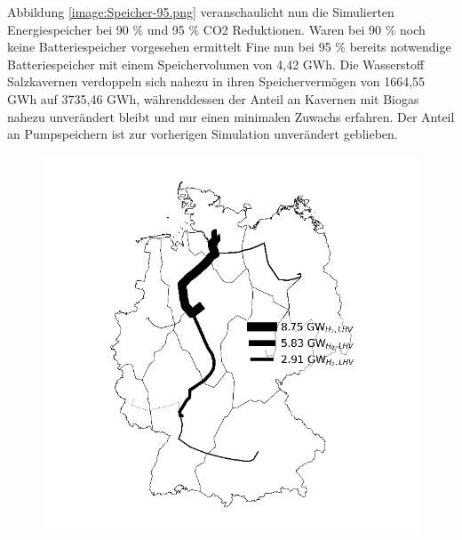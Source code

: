Abbildung \ref{image:Speicher-95.png} veranschaulicht nun die Simulierten Energiespeicher bei 90 \% und 95 \% CO2 Reduktionen. Waren bei 90 \% noch keine Batteriespeicher vorgesehen ermittelt Fine nun bei 95 \% bereits notwendige Batteriespeicher mit einem Speichervolumen von 4,42 GWh. Die Wasserstoff Salzkavernen verdoppeln sich nahezu in ihren Speichervermögen von 1664,55 GWh auf 3735,46 GWh, währenddessen der Anteil an Kavernen mit Biogas nahezu unverändert bleibt und nur einen minimalen Zuwachs erfahren. Der Anteil an Pumpspeichern ist zur vorherigen Simulation unverändert geblieben. 

\begin{figure}[!h]
  \begin{minipage}[b]{.4\linewidth} 
     \includegraphics{images/H2Pipeline-95.png}
  \end{minipage}
  \hspace{.1\linewidth}
  \begin{minipage}[b]{.4\linewidth} 

\end{minipage}
\end{figure}

